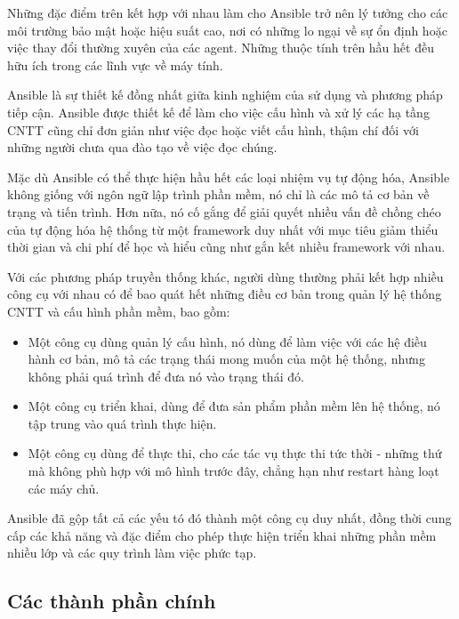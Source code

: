 Những đặc điểm trên kết hợp với nhau làm cho Ansible trở nên lý tưởng cho các môi trường bảo mật hoặc hiệu suất cao, nơi có những lo ngại về sự ổn định hoặc việc thay đổi thường xuyên của các agent. Những thuộc tính trên hầu hết đều hữu ích trong các lĩnh vực về máy tính.

Ansible là sự thiết kế đồng nhất giữa kinh nghiệm của sử dụng và phương pháp tiếp cận. Ansible được thiết kế để làm cho việc cấu hình và xử lý các hạ tầng CNTT cũng chỉ đơn giản như việc đọc hoặc viết cấu hình, thậm chí đối với những người chưa qua đào tạo về việc đọc chúng.

Mặc dù Ansible có thể thực hiện hầu hết các loại nhiệm vụ tự động hóa, Ansible không giống với ngôn ngữ lập trình phần mềm, nó chỉ là các mô tả cơ bản về trạng và tiến trình. Hơn nữa, nó cố gắng để giải quyết nhiều vấn đề chồng chéo của tự động hóa hệ thống từ một framework duy nhất với mục tiêu giảm thiểu thời gian và chi phí để học và hiểu cũng như gắn kết nhiều framework với nhau.

Với các phương pháp truyền thống khác, người dùng thường phải kết hợp nhiều công cụ với nhau có để bao quát hết những điều cơ bản trong quản lý hệ thống CNTT và cấu hình phần mềm, bao gồm:

\begin{itemize}
\item Một công cụ dùng quản lý cấu hình, nó dùng để làm việc với các hệ điều hành cơ bản, mô tả các trạng thái mong muốn của một hệ thống, nhưng không phải quá trình để đưa nó vào trạng thái đó.

\item Một công cụ triển khai, dùng để đưa sản phẩm phần mềm lên hệ thống, nó tập trung vào quá trình thực hiện.

\item Một công cụ dùng để thực thi, cho các tác vụ thực thi tức thời - những thứ mà không phù hợp với mô hình trước đây, chẳng hạn như restart hàng loạt các máy chủ.
\end{itemize}

Ansible đã gộp tất cả các yếu tó đó thành một công cụ duy nhất, đồng thời cung cấp các khả năng và đặc điểm cho phép thực hiện triển khai những phần mềm nhiều lớp và các quy trình làm việc phức tạp.

\subsection{Các thành phần chính}

